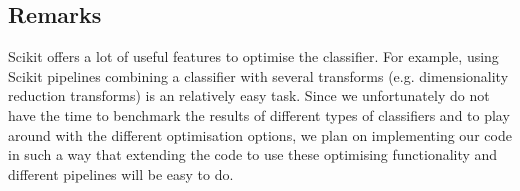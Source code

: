 \subsection{Remarks}
Scikit offers a lot of useful features to optimise the classifier. For example, using Scikit pipelines combining a classifier with several transforms (e.g. dimensionality reduction transforms) is an relatively easy task. Since we unfortunately do not have the time to benchmark the results of different types of classifiers and to play around with the different optimisation options, we plan on implementing our code in such a way that extending the code to use these optimising functionality and different pipelines will be easy to do.
